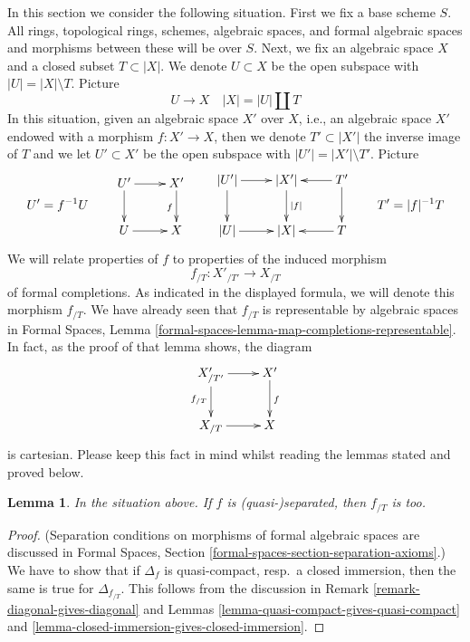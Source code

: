 \documentclass[10pt,a4paper]{amsart}
\theoremstyle{plain}
\newtheorem{lemma}[subsection]{Lemma}
\theoremstyle{definition}
\theoremstyle{remark}
\numberwithin{equation}{subsection}
\begin{document}
\noindent
In this section we consider the following situation.
First we fix a base scheme $S$. All rings, topological rings,
schemes, algebraic spaces, and formal algebraic spaces and
morphisms between these will be over $S$. Next, we fix an
algebraic space $X$ and a closed subset $T \subset |X|$.
We denote $U \subset X$ be the open subspace with $|U| = |X| \setminus T$.
Picture
$$
U \to X \quad |X| = |U| \amalg T
$$
In this situation, given an algebraic space $X'$ over $X$, i.e., an
algebraic space $X'$ endowed with a morphism $f : X' \to X$, then we
denote $T' \subset |X'|$ the inverse image of $T$ and we let $U' \subset X'$
be the open subspace with $|U'| = |X'| \setminus T'$. Picture
$$
U' = f^{-1}U
\quad\quad
\vcenter{
\xymatrix{
U' \ar[d] \ar[r] & X' \ar[d]_f \\
U \ar[r] & X
}
}
\quad\quad
\vcenter{
\xymatrix{
|U'| \ar[r] \ar[d] & |X'| \ar[d]^{|f|} & T' \ar[l] \ar[d] \\
|U| \ar[r] & |X| & T \ar[l]
}
}
\quad\quad
T' = |f|^{-1}T
$$
We will relate properties of $f$ to properties of the induced morphism
$$
f_{/T} : X'_{/T'} \longrightarrow X_{/T}
$$
of formal completions. As indicated in the displayed formula, we will
denote this morphism $f_{/T}$. We have already seen that
$f_{/T}$ is representable by algebraic spaces in
Formal Spaces, Lemma
\ref{formal-spaces-lemma-map-completions-representable}.
In fact, as the proof of that lemma shows, the diagram
$$
\xymatrix{
X'_{/T'} \ar[d]_{f_{/T}} \ar[r] & X' \ar[d]^f \\
X_{/T} \ar[r] & X
}
$$
is cartesian. Please keep this fact in mind whilst reading the lemmas stated
and proved below.

\begin{lemma}
\label{lemma-quasi-separated-gives-quasi-separated}
In the situation above. If $f$ is (quasi-)separated, then
$f_{/T}$ is too.
\end{lemma}

\begin{proof}
(Separation conditions on morphisms of formal algebraic spaces are discussed in
Formal Spaces, Section
\ref{formal-spaces-section-separation-axioms}.)
We have to show that if $\Delta_f$ is quasi-compact, resp.\ a closed immersion,
then the same is true for $\Delta_{f_{/T}}$. This follows from the discussion
in Remark \ref{remark-diagonal-gives-diagonal} and
Lemmas \ref{lemma-quasi-compact-gives-quasi-compact} and
\ref{lemma-closed-immersion-gives-closed-immersion}.
\end{proof}
\end{document}

